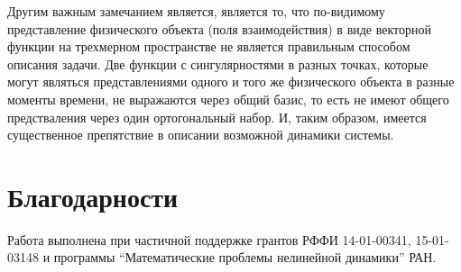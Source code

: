 \documentclass[12pt]{article}
\begin{document}
    Другим важным замечанием является, является то, что по-видимому
    представление физического объекта (поля взаимодействия) в виде векторной
    функции на трехмерном пространстве не является правильным способом
    описания задачи. Две функции с сингулярностями в разных точках,
    которые могут являться представлениями одного и того же физического
    объекта в разные моменты времени, не выражаются через общий базис,
    то есть не имеют общего предстваления через один ортогональный набор.
    И, таким образом, имеется существенное препятствие в описании возможной
    динамики системы.

\section*{Благодарности}
    Работа выполнена при частичной поддержке грантов РФФИ 14-01-00341,
    15-01-03148 и программы ``Математические проблемы нелинейной динамики''
    РАН.
\end{document}
